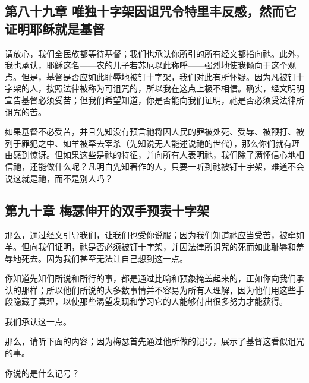 
\subsection{第八十九章 唯独十字架因诅咒令特里丰反感，然而它证明耶稣就是基督}

请放心，我们全民族都等待基督；我们也承认你所引的所有经文都指向祂。此外，我也承认，耶稣这名——农的儿子若苏厄以此称呼——强烈地使我倾向于这个观点。但是，基督是否应如此耻辱地被钉十字架，我们对此有所怀疑。因为凡被钉十字架的人，按照法律被称为可诅咒的，所以我在这点上极不相信。确实，经文明明宣告基督必须受苦；但我们希望知道，你是否能向我们证明，祂是否必须受法律所诅咒的苦。\par

如果基督不必受苦，并且先知没有预言祂将因人民的罪被处死、受辱、被鞭打、被列于罪犯之中、如羊被牵去宰杀（先知说无人能述说祂的世代），那么你们就有理由感到惊讶。但如果这些是祂的特征，并向所有人表明祂，我们除了满怀信心地相信祂，还能做什么呢？凡明白先知著作的人，只要一听到祂被钉十字架，难道不会说这就是祂，而不是别人吗？\par


\subsection{第九十章 梅瑟伸开的双手预表十字架}

那么，通过经文引导我们，让我们也受你说服；因为我们知道祂应当受苦，被牵如羊。但向我们证明，祂是否必须被钉十字架，并因法律所诅咒的死而如此耻辱和羞辱地死去。因为我们甚至无法让自己想到这一点。\par

你知道先知们所说和所行的事，都是通过比喻和预象掩盖起来的，正如你向我们承认的那样；所以他们所说的大多数事情并不容易为所有人理解，因为他们用这些手段隐藏了真理，以使那些渴望发现和学习它的人能够付出很多努力才能获得。\par

我们承认这一点。\par

那么，请听下面的内容；因为梅瑟首先通过他所做的记号，展示了基督这看似诅咒的事。\par

你说的是什么记号？\par

